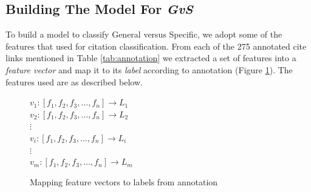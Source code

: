 \subsection*{Building The Model For {\it GvS}}
To build a model to classify General versus Specific, we adopt some of the features that  used for citation classification. From each of the 275 annotated cite links mentioned in Table \ref{tab:annotation} we extracted a set of features into a {\it feature vector} and map it to its {\it label} according to annotation (Figure \ref{fig:featurevector}). The features used are as described below.

\begin{figure}[h]
\centering
$v_1:[f_1, f_2, f_3, \ldots, f_n] \rightarrow L_1$ \\
$v_2:[f_1, f_2, f_3, \ldots, f_n] \rightarrow L_2$ \\
$\vdots$ \\
$v_i:[f_1, f_2, f_3, \ldots, f_n] \rightarrow L_i$ \\
$\vdots$ \\
$v_m:[f_1, f_2, f_3, \ldots, f_n] \rightarrow L_m$
\caption{Mapping feature vectors to labels from annotation}
\label{fig:featurevector}
\end{figure}

